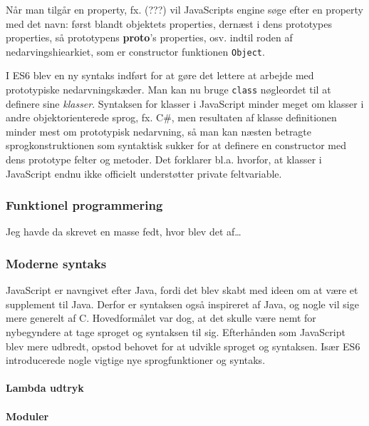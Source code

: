 \documentclass[]{article}
\let\oldparagraph\paragraph
\renewcommand{\paragraph}[1]{\oldparagraph{#1}\mbox{}}
\begin{document}
Når man tilgår en property, fx. (???) vil JavaScripts engine søge efter
en property med det navn: først blandt objektets properties, dernæst i
dens prototypes properties, så prototypens \textbf{proto}'s properties,
osv. indtil roden af nedarvingshiearkiet, som er constructor funktionen
\texttt{Object}.

I ES6 blev en ny syntaks indført for at gøre det lettere at arbejde med
prototypiske nedarvningskæder. Man kan nu bruge \texttt{class}
nøgleordet til at definere sine \emph{klasser}. Syntaksen for klasser i
JavaScript minder meget om klasser i andre objektorienterede sprog, fx.
C\#, men resultaten af klasse definitionen minder mest om prototypisk
nedarvning, så man kan næsten betragte sprogkonstruktionen som
syntaktisk sukker for at definere en constructor med dens prototype
felter og metoder. Det forklarer bl.a. hvorfor, at klasser i JavaScript
endnu ikke officielt understøtter private feltvariable.

\hypertarget{funktionel-programmering}{%
\subsubsection{Funktionel
programmering}\label{funktionel-programmering}}

Jeg havde da skrevet en masse fedt, hvor blev det af\ldots{}

\hypertarget{moderne-syntaks}{%
\subsubsection{Moderne syntaks}\label{moderne-syntaks}}

JavaScript er navngivet efter Java, fordi det blev skabt med ideen om at
være et supplement til Java. Derfor er syntaksen også inspireret af
Java, og nogle vil sige mere generelt af C. Hovedformålet var dog, at
det skulle være nemt for nybegyndere at tage sproget og syntaksen til
sig. Efterhånden som JavaScript blev mere udbredt, opstod behovet for at
udvikle sproget og syntaksen. Især ES6 introducerede nogle vigtige nye
sprogfunktioner og syntaks.

\hypertarget{lambda-udtryk}{%
\paragraph{Lambda udtryk}\label{lambda-udtryk}}

\hypertarget{moduler}{%
\paragraph{Moduler}\label{moduler}}
\end{document}
